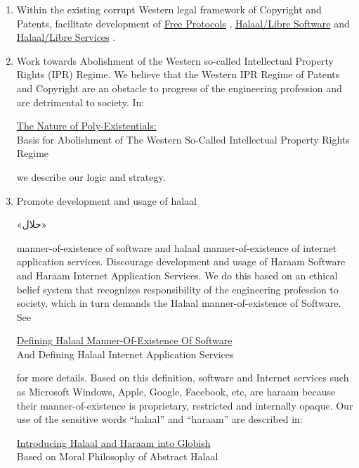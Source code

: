 \begin{enumerate}
  \item 
Within the existing corrupt Western legal framework of Copyright and Patents,
facilitate development of 
\href{http://www.libre-halaal.org/}{Free Protocols}
,
\href{http://www.fsf.org/}{Halaal/Libre Software}
and 
\href{http://www.libreservices.org/}{Halaal/Libre Services}
.
\item Work towards Abolishment of the Western so-called Intellectual Property Rights (IPR)
  Regime.  We believe that the Western IPR Regime of Patents and Copyright are an obstacle
  to progress of the engineering profession and are detrimental to society.  In:
\begin{center}
\href{http://www.persoarabic.org/PLPC/120033}{The Nature of Poly-Existentials:}\\
Basis for Abolishment of The Western So-Called Intellectual Property Rights Regime\\
\end{center}
we describe our logic and strategy.
\item Promote development and usage of halaal \begin{fa}«حلال»\end{fa} manner-of-existence
  of software and halaal manner-of-existence of internet application services.  Discourage
  development and usage of Haraam Software and Haraam Internet Application Services.  We
  do this based on an ethical belief system that recognizes responsibility of the
  engineering profession to society, which in turn demands the Halaal manner-of-existence
  of Software. See
\begin{center}
\href{http://www.persoarabic.org/PLPC/120041}{Defining Halaal Manner-Of-Existence Of Software}\\
And Defining Halaal Internet Application Services\\
\end{center}
for more details. Based on this definition, software and Internet
services such as Microsoft Windows, Apple, Google, Facebook, etc, are
haraam because their manner-of-existence is proprietary, restricted
and internally opaque. 
Our use of the sensitive words ``halaal'' and
``haraam'' are described in:
\begin{center}
\href{http://www.persoarabic.org/PLPC/120041}{Introducing Halaal and Haraam into Globish}\\
Based on Moral Philosophy of Abstract Halaal\\
\end{center}
\end{enumerate}

